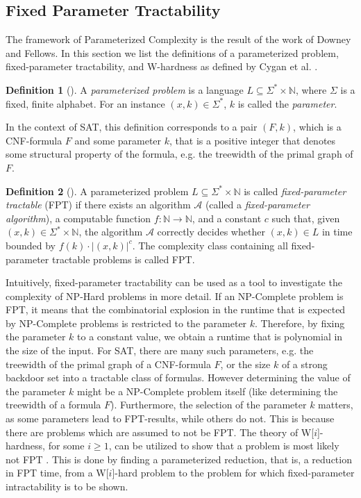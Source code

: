 \documentclass[11pt,a4paper]{article}
\theoremstyle{definition}
\newtheorem{definition}{Definition}[section]
\theoremstyle{proposition}
\begin{document}
\subsection{Fixed Parameter Tractability}
The framework of Parameterized Complexity is the result of the work of Downey and Fellows. In this section we list the definitions of a parameterized problem, fixed-parameter tractability, and W-hardness as defined by Cygan et al. \cite{Cygan2015}.
\begin{definition}[{\cite[Chapter 1, p.12]{Cygan2015}}]
A \textit{parameterized problem} is a language $L \subseteq \Sigma^* \times \mathbb{N}$, where $\Sigma$ is a fixed, finite alphabet. For an instance $(x,k) \in \Sigma^*$, $k$ is called the \textit{parameter}.
\end{definition}
In the context of SAT, this definition corresponds to a pair $(F, k)$, which is a CNF-formula $F$ and some parameter $k$, that is a positive integer that denotes some structural property of the formula, e.g. the treewidth of the primal graph of $F$. 
\begin{definition}[{\cite[Chapter 1, p.13]{Cygan2015}}]
A parameterized problem $L \subseteq \Sigma^* \times \mathbb{N}$ is called \textit{fixed-parameter tractable} (FPT) if there exists an algorithm $\mathcal{A}$ (called a \textit{fixed-parameter algorithm}), a computable function $f : \mathbb{N} \to \mathbb{N}$, and a constant $c$ such that, given $(x,k) \in \Sigma^* \times \mathbb{N}$, the algorithm $\mathcal{A}$ correctly decides whether $(x,k) \in L$ in time bounded by $f(k) \cdot |(x,k)|^c$. The complexity class containing all fixed-parameter tractable problems is called FPT. 
\end{definition}
Intuitively, fixed-parameter tractability can be used as a tool to investigate the complexity of NP-Hard problems in more detail. If an NP-Complete problem is FPT, it means that the combinatorial explosion in the runtime that is expected by NP-Complete problems is restricted to the parameter $k$. Therefore, by fixing the parameter $k$ to a constant value, we obtain a runtime that is polynomial in the size of the input. For SAT, there are many such parameters, e.g. the treewidth of the primal graph of a CNF-formula $F$, or the size $k$ of a strong backdoor set into a tractable class of formulas. However determining the value of the parameter $k$ might be a NP-Complete problem itself (like determining the treewidth of a formula $F$). Furthermore, the selection of the parameter $k$ matters, as some parameters lead to FPT-results, while others do not. This is because there are problems which are assumed to not be FPT. The theory of W[$i$]-hardness, for some $i \geq 1$, can be utilized to show that a problem is most likely not FPT \cite[Chapter 13]{Cygan2015}. This is done by finding a parameterized reduction, that is, a reduction in FPT time, from a W[$i$]-hard problem to the problem for which fixed-parameter intractability is to be shown. 
\end{document}
